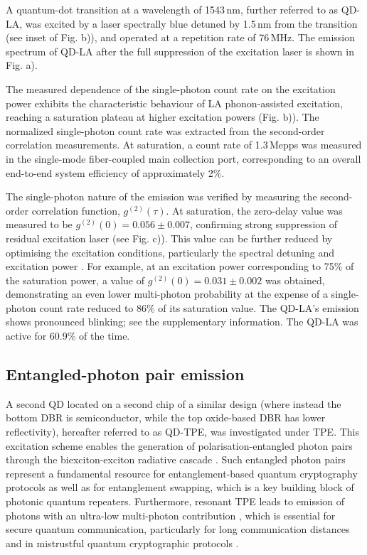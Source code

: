 \documentclass[aps,pra,twocolumn,superscriptaddress]{revtex4-1}
\begin{document}
A quantum-dot transition at a wavelength of 1543\,nm, further referred to as QD-LA, was excited by a laser spectrally blue detuned by 1.5\,nm from the transition (see inset of Fig. b)), and operated at a repetition rate of 76\,MHz. The emission spectrum of QD-LA after the full suppression of the excitation laser is shown in Fig. a).

The measured dependence of the single-photon count rate on the excitation power exhibits the characteristic behaviour of LA phonon-assisted excitation, reaching a saturation plateau at higher excitation powers (Fig. b)). The normalized single-photon count rate was extracted from the second-order correlation measurements. At saturation, a count rate of 1.3\,Mepps was measured in the single-mode fiber-coupled main collection port, corresponding to an overall end-to-end system efficiency of approximately 2\%.

The single-photon nature of the emission was verified by measuring the second-order correlation function, $g^{(2)}(\tau)$. At saturation, the zero-delay value was measured to be $g^{(2)}(0) = 0.056 \pm 0.007$, confirming strong suppression of residual excitation laser (see Fig. c)). This value can be further reduced by optimising the excitation conditions, particularly the spectral detuning and excitation power . For example, at an excitation power corresponding to 75\% of the saturation power, a value of $g^{(2)}(0) = 0.031 \pm 0.002$ was obtained, demonstrating an even lower multi-photon probability at the expense of a single-photon count rate reduced to 86\% of its saturation value. The QD-LA's emission shows pronounced blinking; see the supplementary information. The QD-LA was active for 60.9\% of the time.

\subsection{Entangled-photon pair emission}

A second QD located on a second chip of a similar design (where instead the bottom DBR is semiconductor, while the top oxide-based DBR has lower reflectivity), hereafter referred to as QD-TPE, was investigated under TPE. This excitation scheme enables the generation of polarisation-entangled photon pairs through the biexciton-exciton radiative cascade . Such entangled photon pairs represent a fundamental resource for entanglement-based quantum cryptography protocols as well as for entanglement swapping, which is a key building block of photonic quantum repeaters. Furthermore, resonant TPE leads to emission of photons with an ultra-low multi-photon contribution , which is essential for secure quantum communication, particularly for long communication distances and in mistrustful quantum cryptographic protocols .
\end{document}
